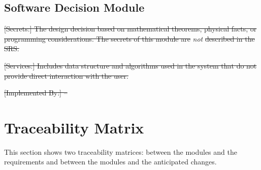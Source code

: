 \documentclass[12pt, titlepage]{article}
\begin{document}
\subsection{Software Decision Module}

\begin{description}
\item\sout{[Secrets:] The design decision based on mathematical theorems, physical
  facts, or programming considerations. The secrets of this module are}
  \emph{not} \sout{described in the SRS.}
\item\sout{[Services:] Includes data structure and algorithms used in the system that
  do not provide direct interaction with the user. }
\item\sout{[Implemented By:] --}
\end{description}


\section{Traceability Matrix} \label{SecTM}

This section shows two traceability matrices: between the modules and the
requirements and between the modules and the anticipated changes.
\end{document}
